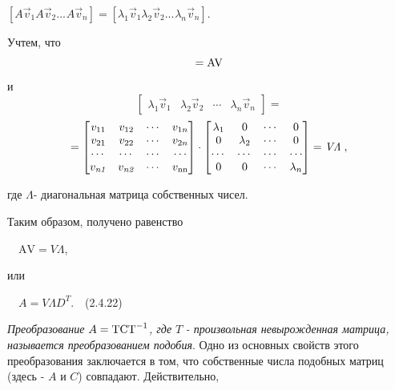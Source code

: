 		$[A\vec v_1^{}A\vec v_2^{}...^{}A\vec v_n]=[\lambda _1\vec v_1^{}\lambda _2\vec v_2^{}...^{}\lambda _n\vec v_n]$.



		Учтем, что
\begin{equation*}
[A\vec v_1^{}A\vec v_2^{}...^{}A\vec v_n]=\normalsubformula{\text{AV}}
\end{equation*}
		и
\begin{equation*}
\left[\begin{matrix}\lambda _1\vec v_1&\lambda _2\vec v_2&\cdots &\lambda _n\vec v_n\end{matrix}\right]=
\end{equation*}
\begin{equation*}
=\left[\begin{matrix}v_{11}&v_{12}&\cdots &v_{1n}\\v_{21}&v_{22}&\cdots &v_{2n}\\\cdots &\cdots &\cdots &\cdots
\\v_{\mathit{n1}}&v_{\mathit{n2}}&\cdots &v_{\normalsubformula{\text{nn}}}\end{matrix}\right]\cdot
\left[\begin{matrix}\lambda _1&0&\cdots &0\\0&\lambda _2&\cdots &0\\\cdots &\cdots &\cdots &\cdots \\0&0&\cdots
&\lambda _n\end{matrix}\right]=\mathit{V\Lambda }\;,
\end{equation*}

		где  $\Lambda $- диагональная матрица собственных чисел.



		Таким образом, получено равенство



		\ \  $\text{AV}=\mathit{V\Lambda }$,



		или



		\ \  $A=\mathit{V\Lambda D}^T$.\ \ (2.4.22)



		\textit{Преобразование } $A=\normalsubformula{\text{TCT}}^{-1}$\textit{, где } $T$\textit{ - произвольная невырожденная
			матрица, называется преобразованием подобия}. Одно из основных свойств этого преобразования заключается в том, что
		собственные числа подобных матриц (здесь -  $A$ и  $C$) совпадают. Действительно,



